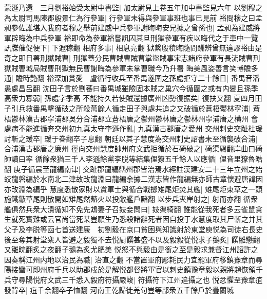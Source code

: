 蒙遜乃還　三月劉裕始受太尉中書監|{
	加太尉見上卷五年加中書監見六年}
以劉穆之為太尉司馬陳郡殷景仁為行參軍|{
	行參軍未得與參軍事班也事已見前}
裕問穆之曰孟昶參佐誰堪入我府者穆之舉前建威中兵參軍謝晦晦安兄據之曾孫也|{
	孟昶為建威將軍辟晦為中兵參軍}
裕即命為參軍裕嘗訊囚其旦刑獄參軍有疾以晦代之于車中一覽訊牒催促便下|{
	下遐稼翻}
相府多事|{
	相息亮翻}
獄繫殷積晦隨問酬辨曾無違謬裕由是奇之即日署刑獄賊曹|{
	刑獄蓋分民曹賊曹賊曹掌盜賊事宋志諸府參軍有長流賊曹刑獄賊曹城局賊曹刑獄無民曹謝晦為參軍未掌曹職今乃升署}
晦美風姿善言笑博贍多通|{
	贍時艶翻}
裕深加賞愛　盧循行收兵至番禺遂圍之孫處拒守二十餘日|{
	番禺音潘愚處昌呂翻}
沈田子言於劉蕃曰番禺城雖險固本賊之巢穴今循圍之或有内變且孫季高衆力寡弱|{
	孫處字季高}
不能持久若使賊還據廣州凶勢復振矣|{
	復扶又翻}
夏四月田子引兵救番禺擊循破之所殺萬餘人循走田子與處共追之又破循於蒼梧鬱林寜浦|{
	蒼梧鬱林漢古郡寜浦郡吳分合浦郡立蒼梧唐之鬱州鬱林唐之鬱林州寜浦唐之横州}
會處病不能進循奔交州初九真太守李遜作亂|{
	九真漢古郡唐之愛州}
交州刺史交趾杜瑗討斬之瑗卒|{
	瑗于眷翻卒子息翻}
朝廷以其子慧度為交州刺史詔書未至循襲破合浦|{
	合浦漢古郡唐之廉州}
徑向交州慧度帥州府文武拒循於石碕破之|{
	碕渠羈翻岸曲曰碕帥讀曰率}
循餘衆猶三千人李遜餘黨李脱等結集俚獠五千餘人以應循|{
	俚音里獠魯皓翻}
庚子循晨至龍編南津|{
	交趾郡龍編縣州郡皆治焉水經註漢建安二十三年立州之始蛟龍磐編於水南北二津故改龍淵曰龍編余據二漢志皆作龍編無亦師古章懷避唐諱因亦改淵為編乎}
慧度悉散家財以賞軍士與循合戰擲雉尾炬焚其艦|{
	雉尾炬束草之一頭施鐵鏃草尾則散開如雉尾然爇火以投敵艦戶黯翻}
以步兵夾岸射之|{
	射而亦翻}
循衆艦俱然兵衆大潰循知不免先鴆妻子召妓妾問曰|{
	妓渠綺翻}
誰能從我死者多云雀鼠貪生就死實難或云官尚當死某豈願生乃悉殺諸辭死者因自投于水慧度取其尸斬之并其父子及李脱等函七首送建康　初劉毅在京口貧困與知識射於東堂庾悦為司徒右長史後至奪其射堂衆人皆避之毅獨不去悦厨饌甚盛不以及毅毅從悦求子鵝炙|{
	饌雛戀翻又雛睆翻炙之夜翻子鵝為炙尤肥美}
悦怒不與毅由是銜之至是毅求兼督江州詔許之因奏稱江州内地以治民為職|{
	治直之翻}
不當置軍府彫耗民力宜罷軍府移鎮豫章而尋陽接蠻可即州府千兵以助郡戍於是解悦都督將軍官以刺史鎮豫章毅以親將趙恢領千兵守尋陽悦府文武三千悉入毅府符攝嚴峻|{
	符攝符下江州追攝之也}
悦忿懼至豫章疽發背卒|{
	疽千余翻卒子恤翻}
河南王乾歸徙羌句豈等部衆五千餘戶於疊蘭城

